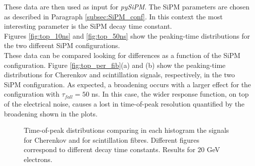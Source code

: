 These data are then used as input for \textit{pySiPM}. The SiPM parameters are chosen as described in Paragraph \ref{subsec:SiPM_conf}. In this context the most interesting parameter is the SiPM decay time constant.\\
Figures \ref{fig:top_10ns} and \ref{fig:top_50ns} show the peaking-time distributions for the two different SiPM configurations.\\
These data can be compared looking for differences as a function of the SiPM configuration.
Figure \ref{fig:top_per_fib}(a) and (b) show the peaking-time distributions for Cherenkov and scintillation signals, respectively, in the two SiPM configuration. As expected, a broadening occurs with a larger effect for the configuration with $\tau_{fall} = 50$ ns. 
In this case, the wider response function, on top of the electrical noise, causes a lost in time-of-peak resolution quantified by the broadening shown in the plots.\\

\begin{figure}
	\centering
	 \quad
	\caption{Time-of-peak distributions comparing in each histogram the signals for Cherenkov and for scintillation fibres. Different figures correspond to different decay time constants. Results for $20$ GeV electrons.}
	\label{fig:top_per_tau}
\end{figure}

